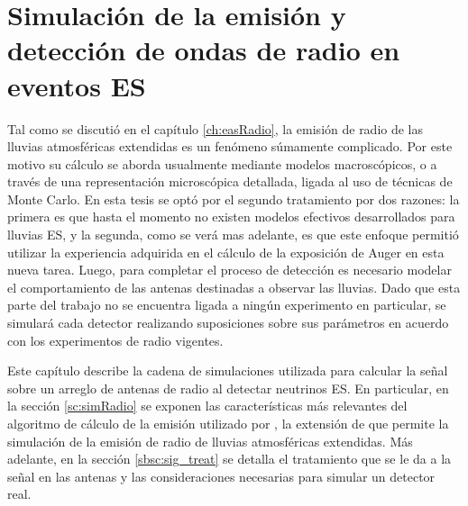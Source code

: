 \chapter{Simulaci\'on de la emisi\'on y detecci\'on de ondas de radio en eventos ES}
\label{ch:simulacionRadio}

Tal como se discuti\'o en el cap\'itulo \ref{ch:easRadio}, la emisi\'on de radio de las lluvias atmosf\'ericas extendidas es un fen\'omeno s\'umamente complicado.
Por este motivo su c\'alculo se aborda usualmente mediante modelos macrosc\'opicos, o a trav\'es de una representaci\'on microsc\'opica detallada, ligada al uso de t\'ecnicas de Monte Carlo.
En esta tesis se opt\'o por el segundo tratamiento por dos razones: la primera es que hasta el momento no existen modelos efectivos desarrollados para lluvias ES, y la segunda, como se ver\'a mas adelante, es que este enfoque permiti\'o utilizar la experiencia adquirida en el c\'alculo de la exposici\'on de Auger en esta nueva tarea.
Luego, para completar el proceso de detecci\'on es necesario modelar el comportamiento de las antenas destinadas a observar las lluvias.
Dado que esta parte del trabajo no se encuentra ligada a ning\'un experimento en particular, se simular\'a cada detector realizando suposiciones sobre sus par\'ametros en acuerdo con los experimentos de radio vigentes.

Este cap\'itulo describe la cadena de simulaciones utilizada para calcular la se\~nal sobre un arreglo de antenas de radio al detectar neutrinos ES.  
En particular, en la secci\'on \ref{sc:simRadio} se exponen las caracter\'isticas m\'as relevantes del algoritmo de c\'alculo de la emisi\'on utilizado por \zhs{}, la extensi\'on de \aires{} que permite la simulaci\'on de la emisi\'on de radio de lluvias atmosf\'ericas extendidas.
M\'as adelante, en la secci\'on \ref{sbsc:sig_treat} se detalla el tratamiento que se le da a la se\~nal en las antenas y las consideraciones necesarias para simular un detector real.


